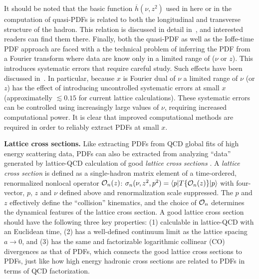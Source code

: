 It should be noted that the basic function $\overline h(\nu,z^2)$ used in here or in the computation of quasi-PDFs is related to both the longitudinal and transverse structure of the hadron. This relation is discussed in detail in~\cite{Musch:2010ka,Radyushkin:2017cyf,Broniowski:2017gfp}, and interested readers can find them there.
Finally, both the quasi-PDF as well as the Ioffe-time PDF approach are faced with a the technical problem of inferring the PDF from a Fourier transform where data are know only in  a limited range of ($\nu$ or $z$). This introduces systematic errors that require careful study. Such effects have been discussed in~\cite{Chen:2017lnm,Lin:2017ani,Broniowski:2017gfp}. In particular, because $x$ is Fourier dual of $\nu$ a limited range of $\nu$ (or $z$) has the effect of introducing uncontrolled systematic errors at small $x$ (approximatelly $\lesssim 0.15$ for current lattice calculations). These systematic errors  can be controlled using increasingly large values of $\nu$, requiring increased computational power.  It is clear that improved computational methods are required in order to reliably extract PDFs at small $x$.

{\bf Lattice cross sections.}  Like extracting PDFs from QCD global fits of high energy scattering data, PDFs can also be extracted from analyzing ``data'' generated by lattice-QCD calculation of good {\it lattice cross sections} \cite{Ma:2014jla,Ma:2014jga}. A {\it lattice cross section} is defined as a single-hadron matrix element of a time-ordered, renormalized nonlocal operator ${\cal O}_n(z)$: ${\sigma}_{n}(\nu,z^2,p^2)=\langle p| {T}\{{\cal O}_n({z})\}|p\rangle$ with four-vector, $p$, $z$ and $\nu$ defined above and renormalization scale suppressed. The $p$ and $z$ effectively define the ``collision'' kinematics, and the choice of ${\cal O}_n$ determines the dynamical features of the lattice cross section. A good lattice cross section should have the following three key properties: (1) calculable in lattice-QCD with an Euclidean time, (2) has a well-defined continuum limit as the lattice spacing $a\to 0$, and (3) has the same and factorizable logarithmic collinear (CO) divergences as that of PDFs, which connects the good lattice cross sections to PDFs, just like how high energy hadronic cross sections are related to PDFs in terms of QCD factorization.  

